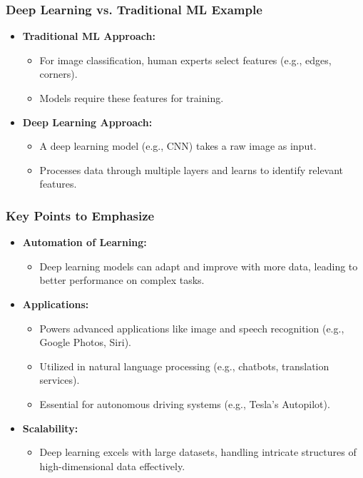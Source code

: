 \documentclass[aspectratio=169]{beamer}
\begin{document}
\begin{frame}[fragile]
    \frametitle{Deep Learning vs. Traditional ML Example}
    
    \begin{itemize}
        \item \textbf{Traditional ML Approach:} 
        \begin{itemize}
            \item For image classification, human experts select features (e.g., edges, corners).
            \item Models require these features for training.
        \end{itemize}

        \item \textbf{Deep Learning Approach:} 
        \begin{itemize}
            \item A deep learning model (e.g., CNN) takes a raw image as input.
            \item Processes data through multiple layers and learns to identify relevant features.
        \end{itemize}
    \end{itemize}
\end{frame}

\begin{frame}[fragile]
    \frametitle{Key Points to Emphasize}
    
    \begin{itemize}
        \item \textbf{Automation of Learning:}
        \begin{itemize}
            \item Deep learning models can adapt and improve with more data, leading to better performance on complex tasks.
        \end{itemize}
        
        \item \textbf{Applications:}
        \begin{itemize}
            \item Powers advanced applications like image and speech recognition (e.g., Google Photos, Siri).
            \item Utilized in natural language processing (e.g., chatbots, translation services).
            \item Essential for autonomous driving systems (e.g., Tesla's Autopilot).
        \end{itemize}
        
        \item \textbf{Scalability:}
        \begin{itemize}
            \item Deep learning excels with large datasets, handling intricate structures of high-dimensional data effectively.
        \end{itemize}
    \end{itemize}
\end{frame}
\end{document}
